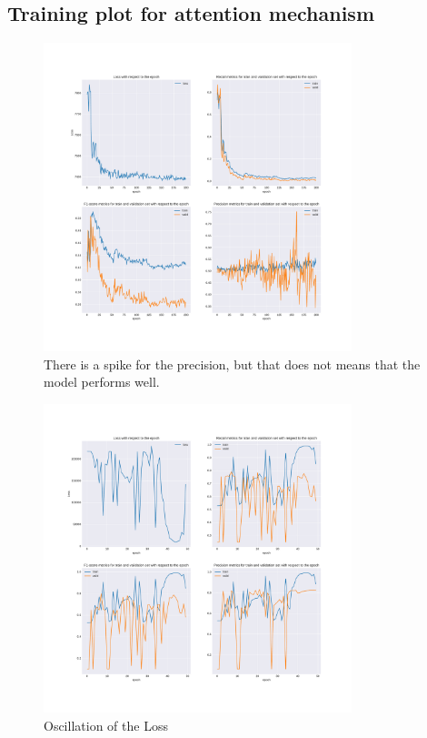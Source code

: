 \chapter{} \label{Appendix2}
\section{Training plot for attention mechanism}
\begin{figure}[h]
	\centering
	\includegraphics[width=0.8\textwidth]{images/chapitre4/appendix2_1.pdf}
	\caption{There is a spike for the precision, but that does not means that the model performs well.}
	\label{appendix2:training_plot1}
\end{figure}

\begin{figure}[h]
	\centering
	\includegraphics[width=0.8\textwidth]{images/chapitre4/attention5_2.pdf}
	\caption{Oscillation of the Loss}
	\label{appendix2:training_plot2}
\end{figure}
